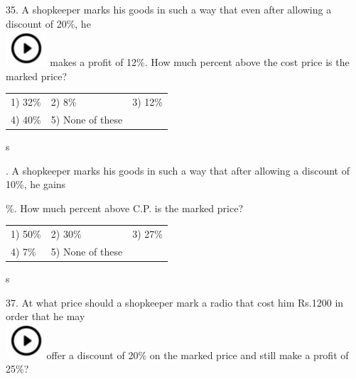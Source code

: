 \documentclass{article}
\begin{document}
	\noindent 
	
	\noindent 
	
	\noindent 
	
	\noindent 
	
	35. A shopkeeper marks his goods in such a way that even after allowing a discount of 20\%, he \noindent \\ \includegraphics*[width=0.60in, height=0.52in]{images/image1} makes a profit of 12\%. How much percent above the cost price is the marked price?
	
	\noindent  
	\begin{tabular}{p{1.7in} p{1.6in} p{1.6in}} \\ 
 1) 32\%                    & 2) 8\%                & 3) 12\%              \\
4) 40\%              & 5) None of these  \\
\end{tabular}s
	
	\noindent 
	
	\noindent 
	
	\noindent 
	
	\noindent 
	
	. A shopkeeper marks his goods in such a way that after allowing a discount of 10\%, he gains
	
	\noindent 
	
	\%. How much percent above C.P. is the marked price?
	
	\noindent 
	
	\noindent  
	\begin{tabular}{p{1.7in} p{1.6in} p{1.6in}} \\ 
 1) 50\%                    & 2) 30\%              & 3) 27\%              \\
4) 7\%                & 5) None of these  \\
\end{tabular}s
	
	\noindent 
	
	\noindent 
	
	\noindent 
	
	37. At what price should a shopkeeper mark a radio that cost him Rs.1200 in order that he may \noindent \\ \includegraphics*[width=0.60in, height=0.52in]{images/image1}offer a discount of 20\% on the marked price and still make a profit of 25\%?
	
\end{document}

